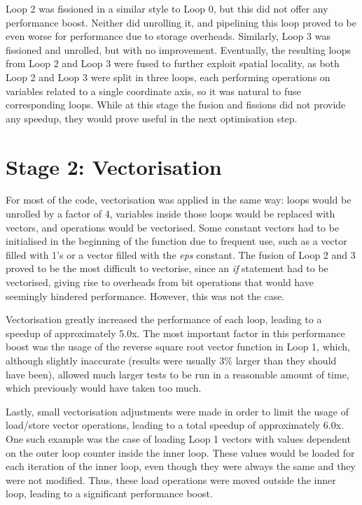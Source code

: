 \documentclass[10pt,a4paper]{article}
\begin{document}
Loop 2 was fissioned in a similar style to Loop 0, but this did not offer any performance boost. Neither did unrolling it, and pipelining this loop proved to be even worse for performance due to storage overheads. Similarly, Loop 3 was fissioned and unrolled, but with no improvement. Eventually, the resulting loops from Loop 2 and Loop 3 were fused to further exploit spatial locality, as both Loop 2 and Loop 3 were split in three loops, each performing operations on variables related to a single coordinate axis, so it was natural to fuse corresponding loops. While at this stage the fusion and fissions did not provide any speedup, they would prove useful in the next optimisation step.

\section*{Stage 2: Vectorisation}

For most of the code, vectorisation was applied in the same way: loops would be unrolled by a factor of 4, variables inside those loops would be replaced with vectors, and operations would be vectorised. Some constant vectors had to be initialised in the beginning of the function due to frequent use, such as a vector filled with 1's or a vector filled with the \textit{eps} constant. The fusion of Loop 2 and 3 proved to be the most difficult to vectorise, since an \textit{if} statement had to be vectorised, giving rise to overheads from bit operations that would have seemingly hindered performance. However, this was not the case.

Vectorisation greatly increased the performance of each loop, leading to a speedup of approximately 5.0x. The most important factor in this performance boost was the usage of the reverse square root vector function in Loop 1, which, although slightly inaccurate (results were usually 3\% larger than they should have been), allowed much larger tests to be run in a reasonable amount of time, which previously would have taken too much.

Lastly, small vectorisation adjustments were made in order to limit the usage of load/store vector operations, leading to a total speedup of approximately 6.0x. One such example was the case of loading Loop 1 vectors with values dependent on the outer loop counter inside the inner loop. These values would be loaded for each iteration of the inner loop, even though they were always the same and they were not modified. Thus, these load operations were moved outside the inner loop, leading to a significant performance boost.
\end{document}
